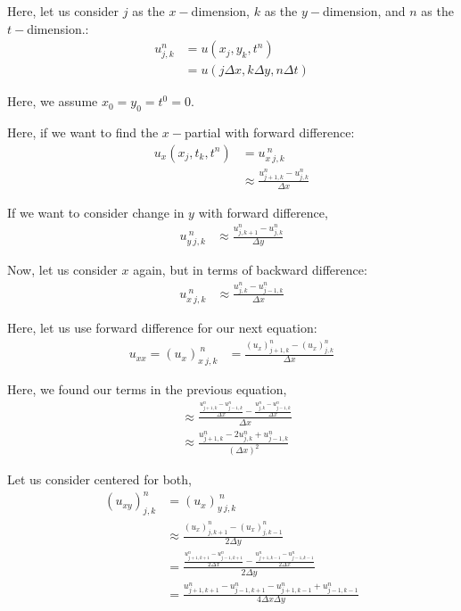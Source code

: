 Here, let us consider $j$ as the $x-$dimension, $k$ as the $y-$dimension, and $n$ as the $t-$dimension.:
%
\begin{align}
  u^n_{j, k} & = u(x_j, y_k, t^n)\\
  & = u(j \Delta x, k \Delta y, n \Delta t)
\end{align}

Here, we assume $x_0 = y_0 = t^0 = 0$.

Here, if we want to find the $x-$partial with forward difference:
%
\begin{align}
  u_x(x_j, t_k, t^n) & = u^{\ n}_{x\ j, k}\\
  & \approx \frac{u^n_{j + 1, k}-u^n_{j, k}}{\Delta x}
\end{align}

If we want to consider change in $y$ with forward difference,
%
\begin{align}
  u^{\ n}_{y\ j, k}
  & \approx \frac{u^n_{j, k + 1}-u^n_{j, k}}{\Delta y}
\end{align}

Now, let us consider $x$ again, but in terms of backward difference:
%
\begin{align}
  u^{\ n}_{x\ j, k} & \approx \frac{u^n_{j, k} - u^n_{j - 1, k}}{\Delta x}
\end{align}


Here, let us use forward difference for our next equation:
%
\begin{align}
  u_{xx} = (u_x)^{\ n}_{x\ j,k}
  & = \frac{(u_x)^n_{j + 1, k} - (u_x)^n_{j, k}}{\Delta x}
\end{align}

Here, we found our terms in the previous equation,
%
\begin{align}
  & \approx
  \frac
  {
  \frac{u^n_{j+1, k} - u^n_{j - 1, k}}{\Delta x} -
  \frac{u^n_{j, k} - u^n_{j - 1, k}}{\Delta x}
  }
  {\Delta x}\\
  & \approx
  \frac
  {
  u^n_{j+1, k} - 2u^n_{j, k} + u^n_{j - 1, k}
  }
  {(\Delta x)^2}
\end{align}

\smallbreak

Let us consider centered for both,
%
\begin{align}
  (u_{xy})^n_{j, k} & = (u_x)^{\ n}_{y\ j, k}\\
  & \approx
  \frac
  {
  (u_x)^n_{j, k+1} - (u_x)^n_{j, k - 1}
  }
  {2 \Delta y}\\
  & =
  \frac
  {
  \frac{u^n_{j + 1, k+1} - u^n_{j-1, k+1}}{2\Delta x}
  -
  \frac{u^n_{j+1, k - 1} - u^n_{j - 1, k - 1}}{2 \Delta x}
  }
  {2\Delta y}\\
  & = \frac
  {
  u^n_{j+1, k+1} -
  u^n_{j-1, k+1} -
  u^n_{j+1, k-1} +
  u^n_{j-1, k-1}
  }
  {4 \Delta x \Delta y}
\end{align}

